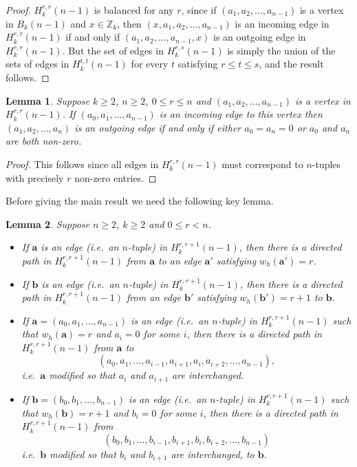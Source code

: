 \documentclass[a4paper,11pt]{article}
\theoremstyle{plain}
\newtheorem{lemma}{Lemma}[section]
\theoremstyle{definition}
\theoremstyle{remark}
\begin{document}
\begin{proof}
$H_k^{r,r}(n-1)$ is balanced for any $r$, since if $(a_1,a_2,\dots,a_{n-1})$ is a vertex in
$B_k(n-1)$ and $x\in \mathbb{Z}_k$, then $(x,a_1,a_2,\dots,a_{n-1})$ is an incoming edge in
$H_k^{r,r}(n-1)$ if and only if $(a_1,a_2,\dots,a_{n-1},x)$ is an outgoing edge in
$H_k^{r,r}(n-1)$.  But the set of edges in $H_k^{r,s}(n-1)$ is simply the union of the sets of
edges in $H_k^{t,t}(n-1)$ for every $t$ satisfying $r\leq t\leq s$, and the result follows.
\end{proof}

\begin{lemma}  \label{lemma:H_successor rule}
Suppose $k\geq2$, $n\geq 2$, $0\leq r\leq n$ and $(a_1,a_2,\dots,a_{n-1})$ is a vertex in
$H_k^{r,r}(n-1)$.  If $(a_0,a_1,\dots,a_{n-1})$ is an incoming edge to this vertex then
$(a_1,a_2,\dots,a_{n})$ is an outgoing edge if and only if either $a_0=a_n=0$ or $a_0$ and $a_n$
are both non-zero.
\end{lemma}

\begin{proof}
This follows since all edges in $H_k^{r,r}(n-1)$ must correspond to $n$-tuples with precisely $r$
non-zero entries.
\end{proof}

Before giving the main result we need the following key lemma.

\begin{lemma}  \label{lemma:H_prelims}
Suppose $n\geq2$, $k\geq2$ and $0\leq r<n$.
\begin{itemize}
\item[(i)] If $\mathbf{a}$ is an edge (i.e.\ an $n$-tuple) in $H_k^{r,r+1}(n-1)$, then there is
    a directed path in $H_k^{r,r+1}(n-1)$ from $\mathbf{a}$ to an edge $\mathbf{a}'$ satisfying
    $w_h(\mathbf{a}')=r$.
\item[(ii)] If $\mathbf{b}$ is an edge (i.e.\ an $n$-tuple) in $H_k^{r,r+1}(n-1)$, then there
    is a directed path in $H_k^{r,r+1}(n-1)$ from an edge $\mathbf{b}'$ satisfying
    $w_h(\mathbf{b}')=r+1$ to $\mathbf{b}$.
\item[(iii)] If $\mathbf{a}=(a_0,a_1,\dots,a_{n-1})$ is an edge (i.e.\ an $n$-tuple) in
    $H_k^{r,r+1}(n-1)$ such that $w_h(\mathbf{a})=r$ and $a_i=0$ for some $i$, then there is a
    directed path in $H_k^{r,r+1}(n-1)$ from $\mathbf{a}$ to
\[ (a_0,a_1,\dots,a_{i-1},a_{i+1}, a_i,a_{i+2},\dots,a_{n-1}), \]
i.e.\ $\mathbf{a}$ modified so that $a_i$ and $a_{i+1}$ are interchanged.
\item[(iv)] If $\mathbf{b}=(b_0,b_1,\dots,b_{n-1})$ is an edge (i.e.\ an $n$-tuple) in
    $H_k^{r,r+1}(n-1)$ such that $w_h(\mathbf{b})=r+1$ and $b_i=0$ for some $i$, then there is
    a directed path in $H_k^{r,r+1}(n-1)$ from
\[ (b_0,b_1,\dots,b_{i-1},b_{i+1},b_{i},b_{i+2},\dots,b_{n-1}) \]
i.e.\ $\mathbf{b}$ modified so that $b_i$ and $b_{i+1}$ are interchanged, to $\mathbf{b}$.
\end{itemize}
\end{lemma}
\end{document}
